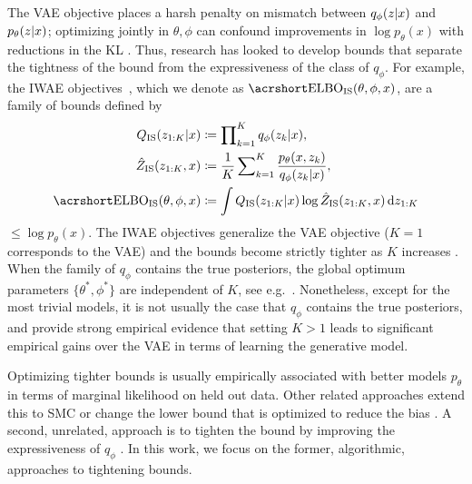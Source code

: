 The \gls{VAE} objective places a harsh penalty on mismatch between $q_{\phi}(z \lvert x)$ and $p_{\theta}(z \lvert x)$; optimizing jointly in $\theta, \phi$ can confound improvements in $\log p_{\theta}(x)$ with reductions in the KL \citep{turner2011two}. Thus, research has looked to develop bounds that separate the tightness of the bound from the expressiveness of the class of $q_{\phi}$. For example, the \gls{IWAE} objectives~\citep{burda2016importance}, which we
denote as $\ELBO_{\text{IS}}(\theta, \phi, x)$, are a family of bounds defined by
\begin{align}
	Q_{\text{IS}}(z_{1:K} \given x) &\coloneqq \prod\nolimits_{k = 1}^K q_{\phi}(z_k \given x), \nonumber
	\\
	\hat Z_{\text{IS}}(z_{1:K}, x) &\coloneqq \frac{1}{K}\sum\nolimits_{k = 1}^K \frac{p_{\theta}(x, z_k)}{q_{\phi}(z_k \given x)}, \label{eq:background/q_is_z_is}\\
	\ELBO_{\text{IS}}(\theta, \phi, x) &\coloneqq \int Q_{\text{IS}}(z_{1:K} \given x) \log \hat Z_{\text{IS}}(z_{1:K}, x) \,\mathrm dz_{1:K}
	\nonumber
\end{align}
$\leq \log p_{\theta}(x)$.
The \gls{IWAE} objectives generalize the \gls{VAE} objective ($K=1$ corresponds to the \gls{VAE}) and the bounds become strictly tighter as $K$ increases \cite{burda2016importance}. When the family of $q_{\phi}$ contains the true posteriors, the global optimum parameters $\{\theta^*,\phi^*\}$ are independent of $K$, see e.g.~\cite{le2017auto}. Nonetheless, except for the most trivial models, it is not usually the case that $q_{\phi}$ contains the true posteriors, and \citet{burda2016importance} provide strong empirical evidence that setting
$K>1$ leads to significant empirical gains over the \gls{VAE} in terms of learning the
generative model. 

Optimizing tighter bounds is usually empirically associated with 
better models $p_{\theta}$ in 
terms of marginal likelihood on held out data.
Other related approaches extend this to \gls{SMC} \citep{maddison2017filtering, le2017auto,naesseth2017variational} or change the lower bound that is optimized to reduce the bias \citep{li2016renyi,bamler2017perturbative}.
A second, unrelated, approach is to tighten the bound by improving the expressiveness of $q_{\phi}$ \citep{salimans_markov_2015, tran_variational_2015, rezende_variational_2015, kingma2016improving, maaloe_auxiliary_2016, ranganath2016hierarchical}.
In this work, we focus on the former, algorithmic, approaches to tightening bounds. 

